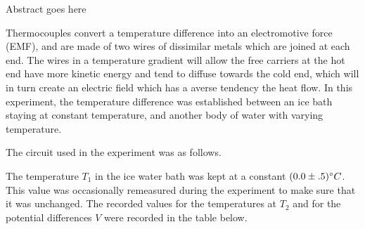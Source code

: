 
\physics

\begin{paperabs}
	
	Abstract goes here
	
\end{paperabs}

\begin{paper}
	

	Thermocouples convert a temperature difference into an electromotive force (EMF), and are made of two wires of dissimilar metals which are joined at each end. The wires in a temperature gradient will allow the free carriers at the hot end have more kinetic energy and tend to diffuse towards the cold end, which will in turn create an electric field which has a averse tendency the heat flow. In this experiment, the temperature difference was established between an ice bath staying at constant temperature, and another body of water with varying temperature. 
	
	
	
	The circuit used in the experiment was as follows.
	
	
	
	The temperature $T_1$ in the ice water bath was kept at a constant $(0.0\pm.5)\degree C$.
	This value was occasionally remeasured during the experiment to make sure that it was unchanged.
	The recorded values for the temperatures at $T_2$ and for the potential differences $V$ were recorded in the table below.
	

\end{paper}
